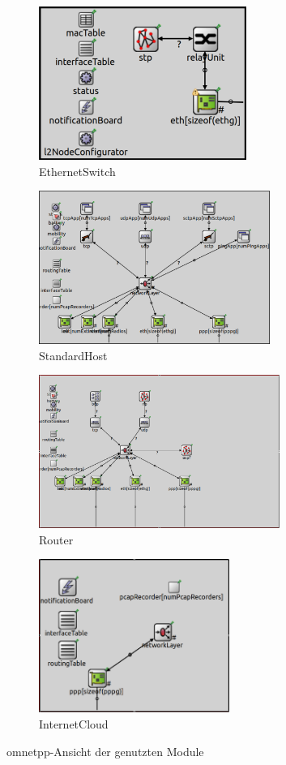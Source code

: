\begin{figure}[ht]
	\centering
	\begin{subfigure}{0.5\textwidth}
		\includegraphics[width=0.7\linewidth, height=5cm, keepaspectratio]{pic/EthernetSwitch}
		\caption[EthernetSwitch]{EthernetSwitch} 
		\label{fig:switch}
	\end{subfigure}%
	\begin{subfigure}{0.5\textwidth}
		\includegraphics[width=0.7\linewidth, height=5cm, keepaspectratio]{pic/StandardHost}
		\caption[StandardHost]{StandardHost} 
		\label{fig:standardHost}
	\end{subfigure}
	\begin{subfigure}{0.5\textwidth}
		\includegraphics[width=0.7\linewidth, height=5cm, keepaspectratio]{pic/Router}
		\caption[Router]{Router} 
		\label{fig:router}
	\end{subfigure}%
	\begin{subfigure}{0.5\textwidth}
		\includegraphics[width=0.7\linewidth, height=5cm, keepaspectratio]{pic/internetCloud}
		\caption[InternetCloud]{InternetCloud} 
		\label{fig:inetCloud}
	\end{subfigure}
	\caption[Wichtige Module]{\gls{omnetpp}-Ansicht der genutzten Module}
	\label{fig:usedModules}
\end{figure}

